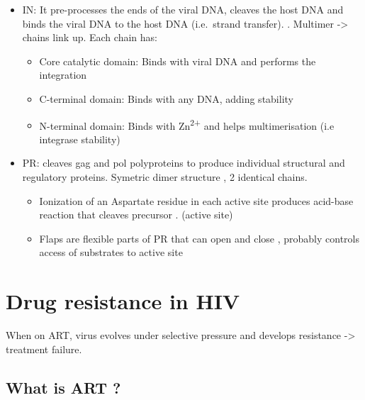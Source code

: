\documentclass[
  11pt,
  twoside]{scrbook}
\begin{document}
\begin{itemize}
\item
  IN: It pre-processes the ends of the viral DNA, cleaves the host DNA and binds the viral DNA to the host DNA (i.e.~strand transfer). \autocite{chiuStructureFunctionHIV12004,espositoHIVIntegraseStructure1999,delelisIntegraseIntegrationBiochemical2008}. Multimer -\textgreater{} chains link up. Each chain has:

  \begin{itemize}
  \item
    Core catalytic domain: Binds with viral DNA and performs the integration
  \item
    C-terminal domain: Binds with any DNA, adding stability
  \item
    N-terminal domain: Binds with Zn\textsuperscript{2+} and helps multimerisation (i.e integrase stability)
  \end{itemize}
\item
  PR: cleaves gag and pol polyproteins to produce individual structural and regulatory proteins. Symetric dimer structure \autocite{pearlStructuralModelRetroviral1987,gulnikHIVProteaseEnzyme2000}, 2 identical chains.

  \begin{itemize}
  \item
    Ionization of an Aspartate residue in each active site produces acid-base reaction that cleaves precursor \autocite{silvaInhibitionCatalyticMechanism1996}. (active site)
  \item
    Flaps are flexible parts of PR that can open and close \autocite{hornakHIV1ProteaseFlaps2006}, probably controls access of substrates to active site \autocite{yuStructuralInsightsHIV12017}
  \end{itemize}
\end{itemize}

\hypertarget{drug-resistance-in-hiv}{%
\section{Drug resistance in HIV}\label{drug-resistance-in-hiv}}

When on ART, virus evolves under selective pressure and develops resistance -\textgreater{} treatment failure.

\hypertarget{what-is-art}{%
\subsection{What is ART ?}\label{what-is-art}}
\end{document}

